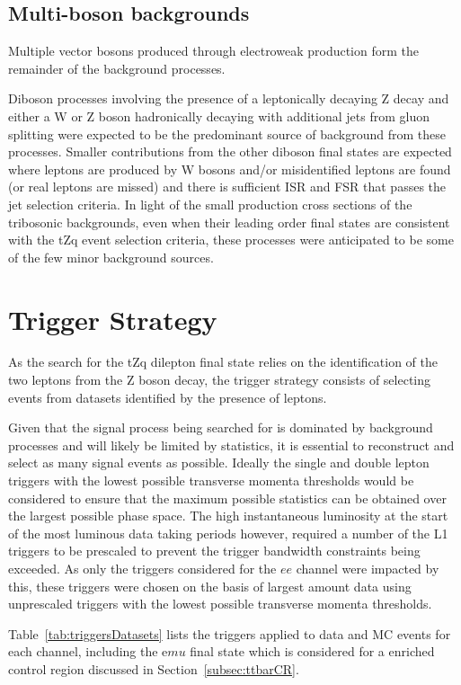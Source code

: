 \subsection{Multi-boson backgrounds}
Multiple vector bosons produced through electroweak production form the remainder of the background processes.

Diboson processes involving the presence of a leptonically decaying Z decay and either a W or Z boson hadronically decaying with additional jets from gluon splitting were expected to be the predominant source of background from these processes.
Smaller contributions from the other diboson final states are expected where leptons are produced by W bosons and/or misidentified leptons are found (or real leptons are missed) and there is sufficient ISR and FSR that passes the jet selection criteria.
In light of the small production cross sections of the tribosonic backgrounds, even when their leading order final states are consistent with the tZq event selection criteria, these processes were anticipated to be some of the few minor background sources.

\section{Trigger Strategy}\label{sec:triggerStrategy}
As the search for the tZq dilepton final state relies on the identification of the two leptons from the Z boson decay, the trigger strategy consists of selecting events from datasets identified by the presence of leptons.


Given that the signal process being searched for is dominated by background processes and will likely be limited by statistics, it is essential to reconstruct and select as many signal events as possible.
Ideally the single and double lepton triggers with the lowest possible transverse momenta thresholds would be considered to ensure that the maximum possible statistics can be obtained over the largest possible phase space.
The high instantaneous luminosity at the start of the most luminous data taking periods however, required a number of the L1 triggers to be prescaled to prevent the trigger bandwidth constraints being exceeded.
As only the triggers considered for the $ee$ channel were impacted by this, these triggers were chosen on the basis of largest amount data using unprescaled triggers with the lowest possible transverse momenta thresholds.

Table~\ref{tab:triggersDatasets} lists the triggers applied to data and MC events for each channel, including the e$mu$ final state which is considered for a \ttbar enriched control region discussed in Section~\ref{subsec:ttbarCR}.

